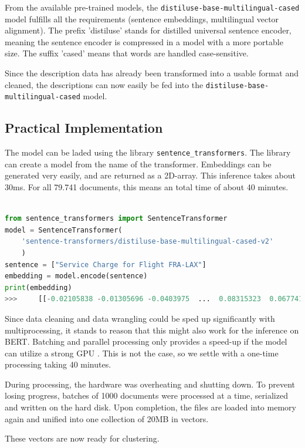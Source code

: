             From the available pre-trained models, the \lstinline|distiluse-base-multilingual-cased| model fulfills all the requirements (sentence embeddings, multilingual vector alignment). The prefix 'distiluse' stands for distilled universal sentence encoder, meaning the sentence encoder is compressed in a model with a more portable size. The suffix 'cased' means that words are handled case-sensitive.
            
            Since the description data has already been transformed into a usable format and cleaned, the descriptions can now easily be fed into the \lstinline|distiluse-base-multilingual-cased| model.
            	
            \subsection{Practical Implementation}
             
             The model can be laded using the library \lstinline|sentence_transformers|. The library can create a model from the name of the transformer. Embeddings can be generated very easily, and are returned as a 2D-array. This inference takes about 30ms. For all 79.741 documents, this means an total time of about 40 minutes.
             
\begin{lstlisting}[language=python,
	label=code:generate-embed,
	caption=Generating an Embedding with BERT,
	style=EigenerPythonStyle]   

from sentence_transformers import SentenceTransformer
model = SentenceTransformer(
	'sentence-transformers/distiluse-base-multilingual-cased-v2'
	)
sentence = ["Service Charge for Flight FRA-LAX"]
embedding = model.encode(sentence)
print(embedding)
>>> 	[[-0.02105838 -0.01305696 -0.0403975  ...  0.08315323  0.06774105  0.03354893]
\end{lstlisting}

		Since data cleaning and data wrangling could be sped up significantly with multiprocessing, it stands to reason that this might also work for the inference on BERT. Batching and parallel processing only provides a speed-up if the model can utilize a strong \ac{GPU} \cite{schopfParallelInferenceHuggingFace2022}. This is not the case, so we settle with a one-time processing taking 40 minutes.
		
		During processing, the hardware was overheating and shutting down. To prevent losing progress, batches of 1000 documents were processed at a time, serialized and written on the hard disk. Upon completion, the files are loaded into memory again and unified into one collection of 20MB in vectors.

		These vectors are now ready for clustering.            